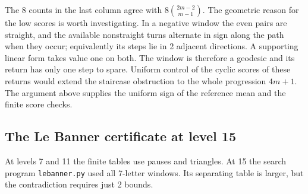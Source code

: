 \documentclass[11pt,a4paper]{amsart}
\begin{document}
The 8 counts in the last column agree with $8\binom{2m-2}{m-1}$. The geometric reason for the low scores is worth investigating. In a negative window the even pairs are straight, and the available nonstraight turns alternate in sign along the path when they occur; equivalently its steps lie in 2 adjacent directions. A supporting linear form takes value one on both. The window is therefore a geodesic and its return has only one step to spare. Uniform control of the cyclic scores of these returns would extend the staircase obstruction to the whole progression $4m+1$. The argument above supplies the uniform sign of the reference mean and the finite score checks.

\subsection{The Le Banner certificate at level 15}\label{sec:lebanner}
At levels 7 and 11 the finite tables use pauses and triangles. At 15 the search program \texttt{lebanner.py} used all 7-letter windows. Its separating table is larger, but the contradiction requires just 2 bounds.
\end{document}
